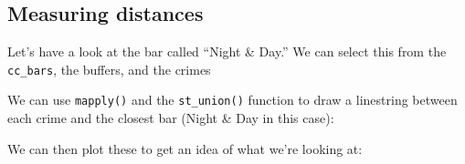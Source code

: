 \documentclass[
]{book}
\newenvironment{Shaded}{\begin{snugshade}}{\end{snugshade}}
\newcommand{\AttributeTok}[1]{\textcolor[rgb]{0.77,0.63,0.00}{#1}}
\newcommand{\ConstantTok}[1]{\textcolor[rgb]{0.00,0.00,0.00}{#1}}
\newcommand{\ControlFlowTok}[1]{\textcolor[rgb]{0.13,0.29,0.53}{\textbf{#1}}}
\newcommand{\DecValTok}[1]{\textcolor[rgb]{0.00,0.00,0.81}{#1}}
\newcommand{\FunctionTok}[1]{\textcolor[rgb]{0.00,0.00,0.00}{#1}}
\newcommand{\NormalTok}[1]{#1}
\newcommand{\OtherTok}[1]{\textcolor[rgb]{0.56,0.35,0.01}{#1}}
\newcommand{\SpecialCharTok}[1]{\textcolor[rgb]{0.00,0.00,0.00}{#1}}
\newcommand{\StringTok}[1]{\textcolor[rgb]{0.31,0.60,0.02}{#1}}
\begin{document}
\hypertarget{measuring-distances}{%
\subsection{Measuring distances}\label{measuring-distances}}

Let's have a look at the bar called ``Night \& Day.'' We can select this from the \texttt{cc\_bars}, the buffers, and the crimes

\begin{Shaded}
\end{Shaded}

We can use \texttt{mapply()} and the \texttt{st\_union()} function to draw a linestring between each crime and the closest bar (Night \& Day in this case):

\begin{Shaded}
\end{Shaded}

We can then plot these to get an idea of what we're looking at:
\end{document}
